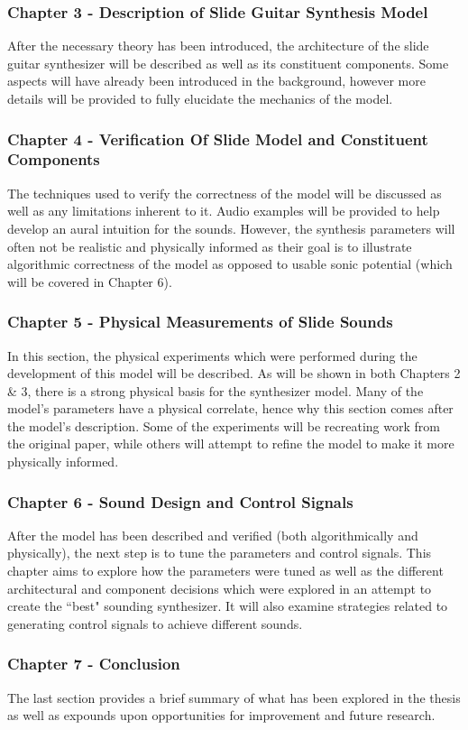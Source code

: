 \documentclass[../main.tex]{subfiles}
\begin{document}
\subsubsection{Chapter 3 - Description of Slide Guitar Synthesis Model}
After the necessary theory has been introduced, the architecture of the slide guitar synthesizer will be described as well as its constituent components. Some aspects will have already been introduced in the background, however more details will be provided to fully elucidate the mechanics of the model.

\subsubsection{Chapter 4 - Verification Of Slide Model and Constituent Components}
The techniques used to verify the correctness of the model will be discussed as well as any limitations inherent to it. Audio examples will be provided to help develop an aural intuition for the sounds. However, the synthesis parameters will often not be realistic and physically informed as their goal is to illustrate algorithmic correctness of the model as opposed to usable sonic potential (which will be covered in Chapter 6).

\subsubsection{Chapter 5 - Physical Measurements of Slide Sounds}
In this section, the physical experiments which were performed during the development of this model will be described. As will be shown in both Chapters 2 \& 3, there is a strong physical basis for the synthesizer model. Many of the model's parameters have a physical correlate, hence why this section comes after the model's description. Some of the experiments will be recreating work from the original paper, while others will attempt to refine the model to make it more physically informed.

\subsubsection{Chapter 6 - Sound Design and Control Signals}
After the model has been described and verified (both algorithmically and physically), the next step is to tune the parameters and control signals. This chapter aims to explore how the parameters were tuned as well as the different architectural and component decisions which were explored in an attempt to create the ``best" sounding synthesizer. It will also examine strategies related to generating control signals to achieve different sounds.

\subsubsection{Chapter 7 - Conclusion}
The last section provides a brief summary of what has been explored in the thesis as well as expounds upon opportunities for improvement and future research.
\end{document}
